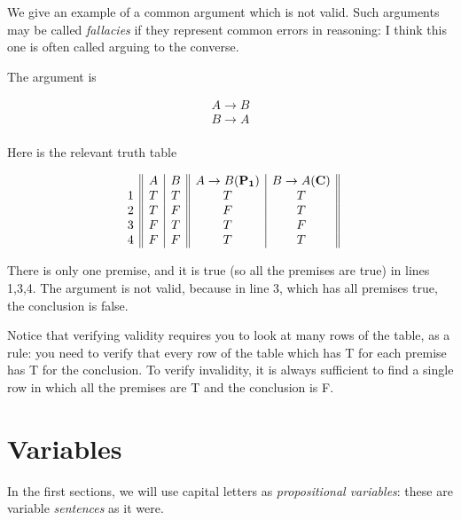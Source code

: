 \documentclass[12pt]{article}
\begin{document}
We give an example of a common argument which is not valid.  Such arguments may be called {\em fallacies\/} if they represent common errors in reasoning:  I think this one is often called arguing to the converse.

The argument is

$$\begin{array}{c}

A \rightarrow B \\ \hline

B \rightarrow A \\ 

\end{array}$$

Here is the relevant truth table

$$\begin{array}{c||c|c||c|c||c}

& A & B & A \rightarrow B ({\bf P_1})& B \rightarrow A ({\bf C})\\

1 & T & T & T & T \\

2 & T & F & F & T \\

3 & F & T & T & F \\

4 & F & F & T & T \\

\end{array}$$

There is only one premise, and it is true (so all the premises are true) in lines 1,3,4.  The argument is not valid, because in line 3, which has all premises true, the conclusion is false.

Notice that verifying validity requires you to look at many rows of the table, as a rule:  you need to verify that every row of the table which has T for each premise has T for the conclusion.  To verify invalidity, it is always sufficient to find a single row in which all the premises are T and the conclusion is F.

\section{Variables}

In the first sections, we will use capital letters as {\em propositional variables\/}:  these are variable {\em sentences\/} as it were.  



\newpage
\end{document}
